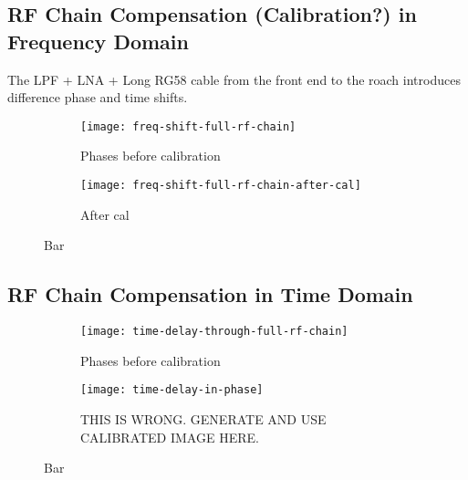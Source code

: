 \subsection{RF Chain Compensation (Calibration?) in Frequency Domain}
The LPF + LNA + Long RG58 cable from the front end to the roach introduces difference phase and time shifts. 

\begin{figure}
  \centering
  \begin{subfigure}[b]{0.49\textwidth}
    \centering
    \texttt{[image: freq-shift-full-rf-chain]}
    \caption{Phases before calibration}
  \end{subfigure}
  \begin{subfigure}[b]{0.49\textwidth}
    \centering
    \texttt{[image: freq-shift-full-rf-chain-after-cal]}
    \caption{After cal}
  \end{subfigure}
  \caption{Bar}
\end{figure}

\subsection{RF Chain Compensation in Time Domain}

\begin{figure}
  \centering
  \begin{subfigure}[b]{0.49\textwidth}
    \centering
    \texttt{[image: time-delay-through-full-rf-chain]}
    \caption{Phases before calibration}
  \end{subfigure}
  \begin{subfigure}[b]{0.49\textwidth}
    \centering
    \texttt{[image: time-delay-in-phase]}
    \caption{THIS IS WRONG. GENERATE AND USE CALIBRATED IMAGE HERE.}
  \end{subfigure}
  \caption{Bar}
\end{figure}
